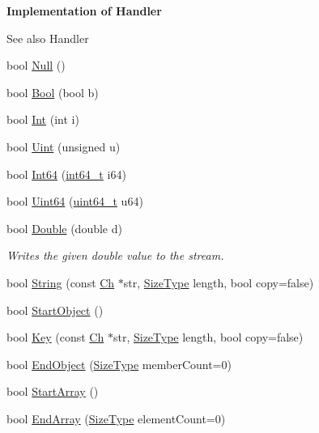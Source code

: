 \begin{Indent}{\bf Implementation of Handler}\par
{\em \begin{DoxySeeAlso}{See also}
Handler 
\end{DoxySeeAlso}
}\begin{DoxyCompactItemize}
\item 
bool \hyperlink{classWriter_a7d80ac367783ac4eb8b0118924b377bd}{Null} ()
\item 
bool \hyperlink{classWriter_adf126d95f0aec7c2f7667df048227929}{Bool} (bool b)
\item 
bool \hyperlink{classWriter_ae006cfa073c369c57797bc842b817ba4}{Int} (int i)
\item 
bool \hyperlink{classWriter_a20c4edc79c0d5a9402e1deb8f09feadf}{Uint} (unsigned u)
\item 
bool \hyperlink{classWriter_aa63032bf3dce66f817267cc451922a6e}{Int64} (\hyperlink{stdint_8h_a414156feea104f8f75b4ed9e3121b2f6}{int64\+\_\+t} i64)
\item 
bool \hyperlink{classWriter_a71b2ee12ae85d181eb9abdb686565615}{Uint64} (\hyperlink{stdint_8h_aec6fcb673ff035718c238c8c9d544c47}{uint64\+\_\+t} u64)
\item 
bool \hyperlink{classWriter_ae80dc830a4f1d84e6eaf6b182c0ceccb}{Double} (double d)
\begin{DoxyCompactList}\small\item\em Writes the given {\ttfamily double} value to the stream. \end{DoxyCompactList}\item 
bool \hyperlink{classWriter_ac317eb622ea116293d99e3edffe6f1c3}{String} (const \hyperlink{classWriter_a5ba0d623162839460024b517fc2d5868}{Ch} $\ast$str, \hyperlink{rapidjson_8h_a5ed6e6e67250fadbd041127e6386dcb5}{Size\+Type} length, bool copy=false)
\item 
bool \hyperlink{classWriter_a393fe59329dfd8110016183090b02d57}{Start\+Object} ()
\item 
bool \hyperlink{classWriter_a88f8aa2df45426ba81d293ddc71698af}{Key} (const \hyperlink{classWriter_a5ba0d623162839460024b517fc2d5868}{Ch} $\ast$str, \hyperlink{rapidjson_8h_a5ed6e6e67250fadbd041127e6386dcb5}{Size\+Type} length, bool copy=false)
\item 
bool \hyperlink{classWriter_a3705f6d3f9a820f0a6652089222ed3ac}{End\+Object} (\hyperlink{rapidjson_8h_a5ed6e6e67250fadbd041127e6386dcb5}{Size\+Type} member\+Count=0)
\item 
bool \hyperlink{classWriter_a8a981ed4f5618a545724789ee4c8dedb}{Start\+Array} ()
\item 
bool \hyperlink{classWriter_ad8680f9f8d3289dad72f1f18a8763aa1}{End\+Array} (\hyperlink{rapidjson_8h_a5ed6e6e67250fadbd041127e6386dcb5}{Size\+Type} element\+Count=0)
\end{DoxyCompactItemize}
\end{Indent}
